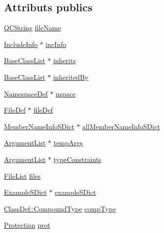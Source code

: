 \subsection*{Attributs publics}
\begin{DoxyCompactItemize}
\item 
\hyperlink{class_q_c_string}{Q\+C\+String} \hyperlink{class_class_def_impl_af4852c18aa3acaa24dd3056896a51605}{file\+Name}
\item 
\hyperlink{struct_include_info}{Include\+Info} $\ast$ \hyperlink{class_class_def_impl_abff21ee2a293a91dd508f664930ab6bc}{inc\+Info}
\item 
\hyperlink{class_base_class_list}{Base\+Class\+List} $\ast$ \hyperlink{class_class_def_impl_a4dd8dc3a52eaf754b7d567a4dc3e0780}{inherits}
\item 
\hyperlink{class_base_class_list}{Base\+Class\+List} $\ast$ \hyperlink{class_class_def_impl_a9134929b4e91fa202dad541f7a9c89ac}{inherited\+By}
\item 
\hyperlink{class_namespace_def}{Namespace\+Def} $\ast$ \hyperlink{class_class_def_impl_ab48a04c16cebd115877f07f540b44c15}{nspace}
\item 
\hyperlink{class_file_def}{File\+Def} $\ast$ \hyperlink{class_class_def_impl_ac2c8c9c6cc2cea9076ad649149505f1a}{file\+Def}
\item 
\hyperlink{class_member_name_info_s_dict}{Member\+Name\+Info\+S\+Dict} $\ast$ \hyperlink{class_class_def_impl_ae645a7a6aceae390224919d15d6df80b}{all\+Member\+Name\+Info\+S\+Dict}
\item 
\hyperlink{class_argument_list}{Argument\+List} $\ast$ \hyperlink{class_class_def_impl_aacfd7b41980ab90e43e015ca2583a56c}{temp\+Args}
\item 
\hyperlink{class_argument_list}{Argument\+List} $\ast$ \hyperlink{class_class_def_impl_af0266bc567e2d9eed094e5ced846ddac}{type\+Constraints}
\item 
\hyperlink{class_file_list}{File\+List} \hyperlink{class_class_def_impl_a4d615eed35e81984df99b64bd9334e55}{files}
\item 
\hyperlink{class_example_s_dict}{Example\+S\+Dict} $\ast$ \hyperlink{class_class_def_impl_a256b7b66998ac4aaf0495a4133fa16a3}{example\+S\+Dict}
\item 
\hyperlink{class_class_def_ae70cf86d35fe954a94c566fbcfc87939}{Class\+Def\+::\+Compound\+Type} \hyperlink{class_class_def_impl_af8b4e7fb963b0feff4a8009a358bd90b}{comp\+Type}
\item 
\hyperlink{types_8h_a90e352184df58cd09455fe9996cd4ded}{Protection} \hyperlink{class_class_def_impl_a08fcc20edfd7a4c7090217f21389f929}{prot}

\end{DoxyCompactItemize}
